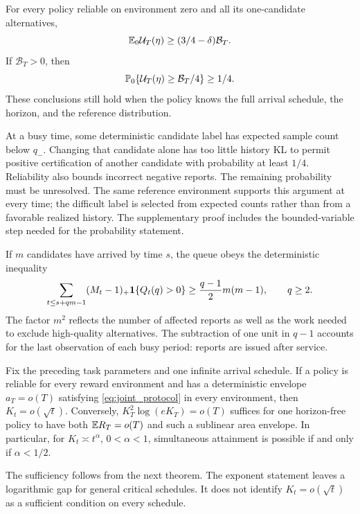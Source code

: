 \documentclass[11pt]{article}
\begin{document}
\begin{theorem}
\label{thm:broadcast}
For every policy reliable on environment zero and all its one-candidate
alternatives,
\[
 \mathbb E_0\mathcal U_T(\eta)\ge(3/4-\delta)\mathcal B_T.
\]
If $\mathcal B_T>0$, then
\[
 \mathbb P_0\{\mathcal U_T(\eta)\ge\mathcal B_T/4\}\ge1/4.
\]
These conclusions still hold when the policy knows the full arrival schedule,
the horizon, and the reference distribution.
\end{theorem}

At a busy time, some deterministic candidate label has expected sample count
below $q_-$. Changing that candidate alone has too little history KL to permit
positive certification of another candidate with probability at least $1/4$.
Reliability also bounds incorrect negative reports. The remaining probability
must be unresolved. The same reference environment supports this argument at
every time; the difficult label is selected from expected counts rather than
from a favorable realized history. The supplementary proof includes the
bounded-variable step needed for the probability statement.

If $m$ candidates have arrived by time $s$, the queue obeys the deterministic
inequality
\begin{equation}
 \sum_{t\le s+qm-1}(M_t-1)_+\mathbf 1\{Q_t(q)>0\}
                  \ge\frac{q-1}{2}m(m-1),\qquad q\ge2.
 \label{eq:queue_area}
\end{equation}
The factor $m^2$ reflects the number of affected reports as well as the work
needed to exclude high-quality alternatives. The subtraction of one unit in
$q-1$ accounts for the last observation of each busy period: reports are issued
after service.

\begin{corollary}
\label{cor:growth}
Fix the preceding task parameters and one infinite arrival schedule. If a
policy is reliable for every reward environment and has a deterministic
envelope $a_T=o(T)$ satisfying \eqref{eq:joint_protocol} in every environment,
then $K_t=o(\sqrt t)$. Conversely, $K_T^2\log(eK_T)=o(T)$ suffices for one
horizon-free policy to have both $\mathbb E R_T=o(T)$ and such a sublinear area
envelope. In particular, for $K_t\asymp t^\alpha$, $0<\alpha<1$, simultaneous
attainment is possible if and only if $\alpha<1/2$.
\end{corollary}

The sufficiency follows from the next theorem. The exponent statement leaves
a logarithmic gap for general critical schedules. It does not identify
$K_t=o(\sqrt t)$ as a sufficient condition on every schedule.
\end{document}
